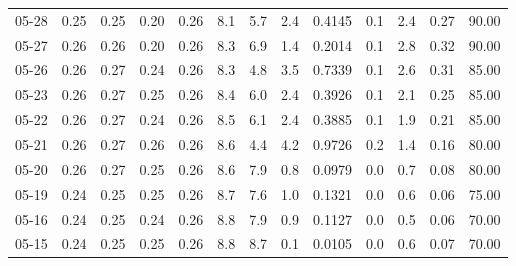 \begin{threeparttable}
{\begin{tabular}{lrrrrrrrrrrrr}
  05-28 &          0.25 &          0.25 &          0.20 &        0.26 &                 8.1 &                 5.7 &        2.4 &       0.4145 &                 0.1 &              2.4 &            0.27 &                  90.00 \\
  05-27 &          0.26 &          0.26 &          0.20 &        0.26 &                 8.3 &                 6.9 &        1.4 &       0.2014 &                 0.1 &              2.8 &            0.32 &                  90.00 \\
  05-26 &          0.26 &          0.27 &          0.24 &        0.26 &                 8.3 &                 4.8 &        3.5 &       0.7339 &                 0.1 &              2.6 &            0.31 &                  85.00 \\
  05-23 &          0.26 &          0.27 &          0.25 &        0.26 &                 8.4 &                 6.0 &        2.4 &       0.3926 &                 0.1 &              2.1 &            0.25 &                  85.00 \\
  05-22 &          0.26 &          0.27 &          0.24 &        0.26 &                 8.5 &                 6.1 &        2.4 &       0.3885 &                 0.1 &              1.9 &            0.21 &                  85.00 \\
  05-21 &          0.26 &          0.27 &          0.26 &        0.26 &                 8.6 &                 4.4 &        4.2 &       0.9726 &                 0.2 &              1.4 &            0.16 &                  80.00 \\
  05-20 &          0.26 &          0.27 &          0.25 &        0.26 &                 8.6 &                 7.9 &        0.8 &       0.0979 &                 0.0 &              0.7 &            0.08 &                  80.00 \\
  05-19 &          0.24 &          0.25 &          0.25 &        0.26 &                 8.7 &                 7.6 &        1.0 &       0.1321 &                 0.0 &              0.6 &            0.06 &                  75.00 \\
  05-16 &          0.24 &          0.25 &          0.24 &        0.26 &                 8.8 &                 7.9 &        0.9 &       0.1127 &                 0.0 &              0.5 &            0.06 &                  70.00 \\
  05-15 &          0.24 &          0.25 &          0.25 &        0.26 &                 8.8 &                 8.7 &        0.1 &       0.0105 &                 0.0 &              0.6 &            0.07 &                  70.00 \\

\end{tabular}}
\end{threeparttable}
